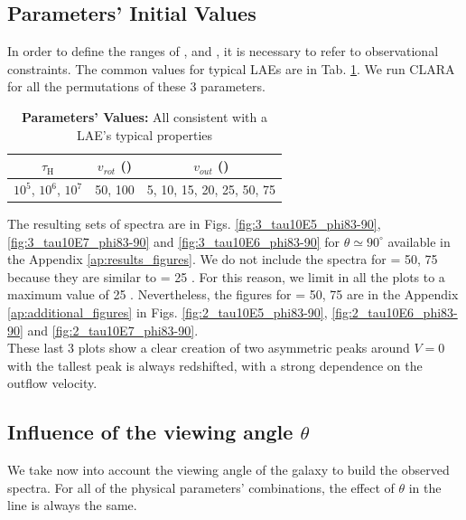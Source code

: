 \documentclass[twocolappendix]{latex/emulateapj}
\begin{document}
\subsection{Parameters' Initial Values}

In order to define the ranges of \tauh, \vrot and \vout, it is necessary to refer to observational constraints. The common values for typical LAEs are in Tab. \ref{tab:values}. We run CLARA for all the permutations of these 3 parameters. \\

\begin{table}[htbp]
	\centering
	\begin{tabular}{|c|c|c|}
		\hline
		$\tau_{\mathrm{H}}$ & $v_{rot}$ (\kms) & $v_{out}$ (\kms) \\
		\hline
		$10^5$, $10^6$, $10^7$ & 50, 100 & 5, 10, 15, 20, 25, 50, 75 \\
		\hline
	\end{tabular}
	\caption{\textbf{Parameters' Values:} All consistent with a LAE's typical properties}
	\label{tab:values}
\end{table}

The resulting sets of spectra are in Figs. \ref{fig:3_tau10E5_phi83-90}, \ref{fig:3_tau10E7_phi83-90} and \ref{fig:3_tau10E6_phi83-90} for $\theta \simeq 90^\circ$ available in the Appendix \ref{ap:results_figures}. We do not include the spectra for \vout = 50, 75 \kms because they are similar to \vout = 25 \kms. For this reason, we limit in all the plots \vout to a maximum value of 25 \kms. Nevertheless, the figures for \vout = 50, 75 \kms are in the Appendix \ref{ap:additional_figures} in Figs. \ref{fig:2_tau10E5_phi83-90}, \ref{fig:2_tau10E6_phi83-90} and \ref{fig:2_tau10E7_phi83-90}.\\

These last 3 plots show a clear creation of two asymmetric peaks around $V=0$ \kms with the tallest peak is always redshifted, with a strong dependence on the outflow velocity.\\

\subsection{Influence of the viewing angle $\theta$}
We take now into account the viewing angle of the galaxy to build the observed spectra. For all of the physical parameters' combinations, the effect of $\theta$ in the \lya line is always the same.\\
\end{document}
